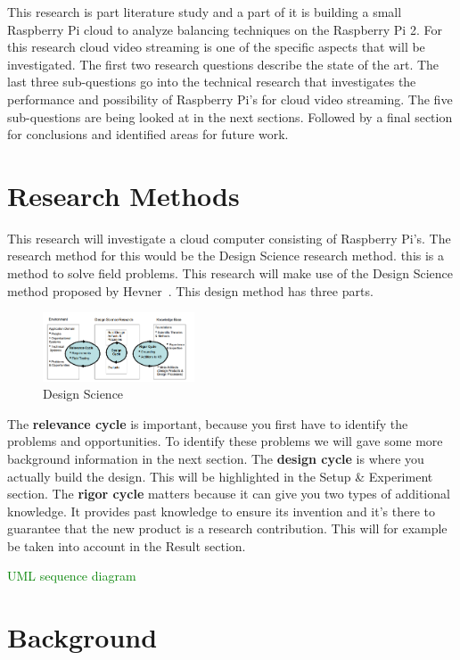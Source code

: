 \documentclass{sig-alternate-br}
\newcommand\todo[1]{
	\textcolor{green}{#1}
}
\begin{document}
This research is part literature study and a part of it is building a small Raspberry Pi cloud to analyze balancing techniques on the Raspberry Pi 2. For this research cloud video streaming is one of the specific aspects that will be investigated. The first two research questions describe the state of the art. The last three sub-questions go into the technical research that investigates the performance and possibility of Raspberry Pi's for cloud video streaming. The five sub-questions are being looked at in the next sections. Followed by a final section for conclusions and identified areas for future work.

\section{Research Methods}
This research will investigate a cloud computer consisting of Raspberry Pi's. The research method for this would be the Design Science research method. this is a method to solve field problems. This research will make use of the Design Science method proposed by Hevner~\cite{hevner:2007}. This design method has three parts. 
\begin{figure}[H]
	\centering 
	\includegraphics[width=0.4\textwidth]{Design_science.png}
	\caption{Design Science}
	\label{fig:design} %
\end{figure}
The \textbf{relevance cycle} is important, because you first have to identify the problems and opportunities. To identify these problems we will gave some more background information in the next section. The \textbf{design cycle} is where you actually build the design. This will be highlighted in the Setup \& Experiment section. The \textbf{rigor cycle} matters because it can give you two types of additional knowledge. It provides past knowledge to ensure its invention and it's there to guarantee that the new product is a research contribution. This will for example be taken into account in the Result section. 

\todo{UML sequence diagram}

\section{Background}
\end{document}
